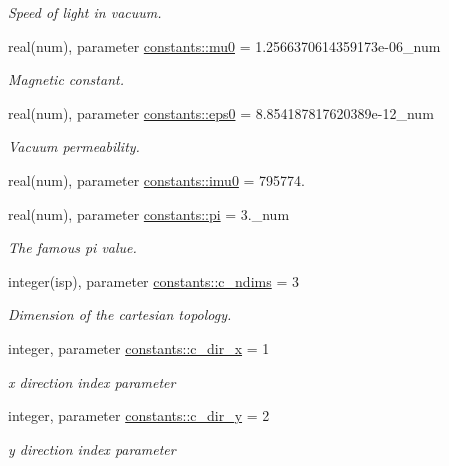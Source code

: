 \begin{DoxyCompactItemize}
\begin{DoxyCompactList}\small\item\em Speed of light in vacuum. \end{DoxyCompactList}\item 
real(num), parameter \hyperlink{namespaceconstants_adf2453bfeefbefa1135a81f4ddfe4d6d}{constants\+::mu0} = 1.\+2566370614359173e-\/06\+\_\+num
\begin{DoxyCompactList}\small\item\em Magnetic constant. \end{DoxyCompactList}\item 
real(num), parameter \hyperlink{namespaceconstants_a4fc609b4d7bd5d8e45e57bd0ba7c5e29}{constants\+::eps0} = 8.\+854187817620389e-\/12\+\_\+num
\begin{DoxyCompactList}\small\item\em Vacuum permeability. \end{DoxyCompactList}\item 
real(num), parameter \hyperlink{namespaceconstants_abcf10ccefe6023e0401ce1b4a5f74fb5}{constants\+::imu0} = 795774.
\item 
real(num), parameter \hyperlink{namespaceconstants_a736c2860cb0585043ad4abcd1c3352b1}{constants\+::pi} = 3.\+\_\+num
\begin{DoxyCompactList}\small\item\em The famous pi value. \end{DoxyCompactList}\item 
integer(isp), parameter \hyperlink{namespaceconstants_aad8d45b739c41f2926fd2accb3de9dd2}{constants\+::c\+\_\+ndims} = 3
\begin{DoxyCompactList}\small\item\em Dimension of the cartesian topology. \end{DoxyCompactList}\item 
integer, parameter \hyperlink{namespaceconstants_a8e38e74e9723ce351e7a20787e649e89}{constants\+::c\+\_\+dir\+\_\+x} = 1
\begin{DoxyCompactList}\small\item\em x direction index parameter \end{DoxyCompactList}\item 
integer, parameter \hyperlink{namespaceconstants_a5d84bc6ed2e3bd7b6e64704dc587825b}{constants\+::c\+\_\+dir\+\_\+y} = 2
\begin{DoxyCompactList}\small\item\em y direction index parameter \end{DoxyCompactList}\item 

\end{DoxyCompactItemize}
